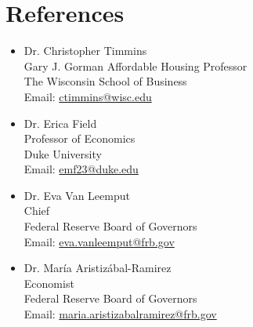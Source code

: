\documentclass[letterpaper,11pt]{article}
\newcommand{\SubHeadingListStart}{\begin{itemize}[leftmargin=0.15in, label={}]}
\newcommand{\SubHeadingListEnd}{\end{itemize}}
\begin{document}

\section{References}

  \SubHeadingListStart
    \item{
      Dr. Christopher Timmins \\
      Gary J. Gorman Affordable Housing Professor \\
      The Wisconsin School of Business \\
      Email: \href{mailto:ctimmins@wisc.edu}{ctimmins@wisc.edu} \\
    }
    \item{
      Dr. Erica Field \\
      Professor of Economics \\
      Duke University \\
      Email: \href{mailto:emf23@duke.edu}{emf23@duke.edu} \\
    }
    \item{
      Dr. Eva Van Leemput \\
      Chief \\
      Federal Reserve Board of Governors \\
      Email: \href{mailto:eva.vanleemput@frb.gov}{eva.vanleemput@frb.gov} \\
    }
    \item{
      Dr. Mar\'{i}a Aristiz\'{a}bal-Ramirez \\
      Economist \\
      Federal Reserve Board of Governors \\
      Email: \href{mailto:maria.aristizabalramirez@frb.gov}{maria.aristizabalramirez@frb.gov} \\
    }
  \SubHeadingListEnd



\end{document}
